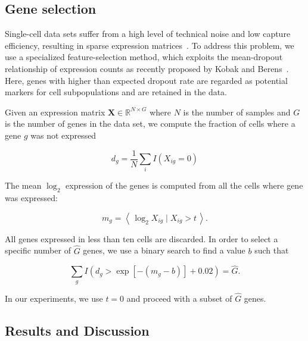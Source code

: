 \documentclass[runningheads]{llncs}
\begin{document}
\subsection{Gene selection\label{sec:gene-selection}}

Single-cell data sets suffer from a high level of technical noise and low
capture efficiency, resulting in sparse expression matrices~\cite{umi}. To
address this problem, we use a specialized feature-selection method, which
exploits the mean-dropout relationship of expression counts as recently
proposed by Kobak and Berens~\cite{art_of_using_tsne}. Here, genes with higher
than expected dropout rate are regarded as potential markers for cell
subpopulations and are retained in the data.

Given an expression matrix $\mathbf{X} \in \mathbb{R}^{N \times G}$ where $N$
is the number of samples and $G$ is the number of genes in the data set, we
compute the fraction of cells where a gene $g$ was not expressed

\begin{equation}
d_g = \frac{1}{N} \sum_i I \left ( X_{ig} = 0\right )
\end{equation}

\noindent The mean $\log_2$ expression of the genes is computed from all the
cells where gene was expressed:

\begin{equation}
m_g = \left \langle \, \log_2 X_{ig} \mid X_{ig} > t \, \right \rangle.
\end{equation}

All genes expressed in less than ten cells are discarded. In order to select a
specific number of $\hat{G}$ genes, we use a binary search to find a value $b$
such that

\begin{equation}
\sum_g I \left (d_g > \exp \left [ -(m_g - b) \right ] + 0.02 \right ) = \hat{G}.
\end{equation}

\noindent In our experiments, we use $t=0$ and proceed with a subset of
$\hat{G}$ genes.

\subsection{Results and Discussion}
\end{document}
